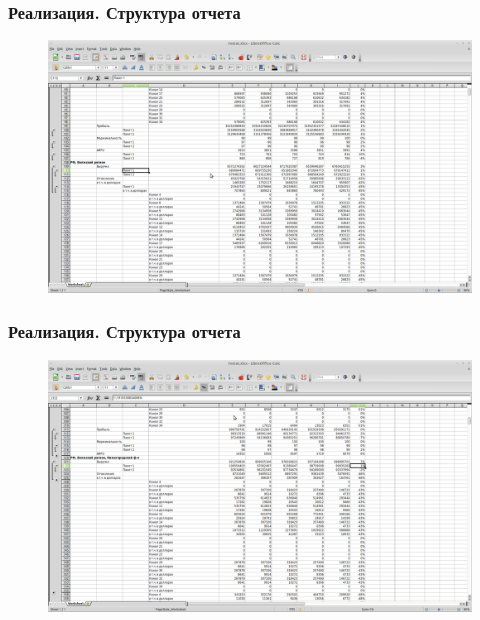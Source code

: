 \documentclass{beamer}
\begin{document}
\begin{frame}
\frametitle{Реализация. Структура отчета}
\begin{figure}
\vspace{-0.5cm}
\hspace*{-1cm} \includegraphics[scale=0.26]{../resources/report1.pdf}
\end{figure}
\end{frame}

\begin{frame}
\frametitle{Реализация. Структура отчета}
\begin{figure}
\vspace{-0.5cm}
\hspace*{-1cm} \includegraphics[scale=0.26]{../resources/report2.pdf}
\end{figure}
\end{frame}
\end{document}
